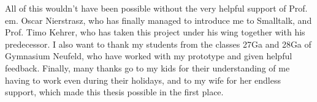 All of this wouldn't have been possible without the very helpful support of Prof.\,em. Oscar Nierstrasz, who has finally managed to introduce me to Smalltalk, and Prof. Timo Kehrer, who has taken this project under his wing together with his predecessor. I also want to thank my students from the classes 27Ga and 28Ga of Gymnasium Neufeld, who have worked with my prototype and given helpful feedback. Finally, many thanks go to my kids for their understanding of me having to work even during their holidays, and to my wife for her endless support, which made this thesis possible in the first place.
